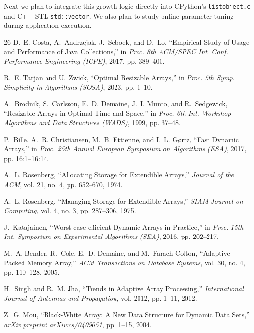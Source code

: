 \documentclass[conference]{IEEEtran}
\begin{document}
Next we plan to integrate this growth logic directly into CPython's \texttt{listobject.c} and C++ STL \texttt{std::vector}. We also plan to study online parameter tuning during application execution.

\begin{thebibliography}{26}
D.~E. Costa, A.~Andrzejak, J.~Seboek, and D.~Lo, ``Empirical Study of Usage and Performance of Java Collections,'' in \emph{Proc. 8th ACM/SPEC Int. Conf. Performance Engineering (ICPE)}, 2017, pp. 389--400.

R.~E. Tarjan and U.~Zwick, ``Optimal Resizable Arrays,'' in \emph{Proc. 5th Symp. Simplicity in Algorithms (SOSA)}, 2023, pp. 1--10.

A.~Brodnik, S.~Carlsson, E.~D. Demaine, J.~I. Munro, and R.~Sedgewick, ``Resizable Arrays in Optimal Time and Space,'' in \emph{Proc. 6th Int. Workshop Algorithms and Data Structures (WADS)}, 1999, pp. 37--48.

P.~Bille, A.~R. Christiansen, M.~B. Ettienne, and I.~L. G{\o}rtz, ``Fast Dynamic Arrays,'' in \emph{Proc. 25th Annual European Symposium on Algorithms (ESA)}, 2017, pp. 16:1--16:14.

A.~L. Rosenberg, ``Allocating Storage for Extendible Arrays,'' \emph{Journal of the ACM}, vol. 21, no. 4, pp. 652--670, 1974.

A.~L. Rosenberg, ``Managing Storage for Extendible Arrays,'' \emph{SIAM Journal on Computing}, vol. 4, no. 3, pp. 287--306, 1975.

J.~Katajainen, ``Worst-case-efficient Dynamic Arrays in Practice,'' in \emph{Proc. 15th Int. Symposium on Experimental Algorithms (SEA)}, 2016, pp. 202--217.

M.~A. Bender, R.~Cole, E.~D. Demaine, and M.~Farach-Colton, ``Adaptive Packed Memory Array,'' \emph{ACM Transactions on Database Systems}, vol. 30, no. 4, pp. 110--128, 2005.

H.~Singh and R.~M. Jha, ``Trends in Adaptive Array Processing,'' \emph{International Journal of Antennas and Propagation}, vol. 2012, pp. 1--11, 2012.

Z.~G. Mou, ``Black-White Array: A New Data Structure for Dynamic Data Sets,'' \emph{arXiv preprint arXiv:cs/0409051}, pp. 1--15, 2004.


\end{thebibliography}
\end{document}
